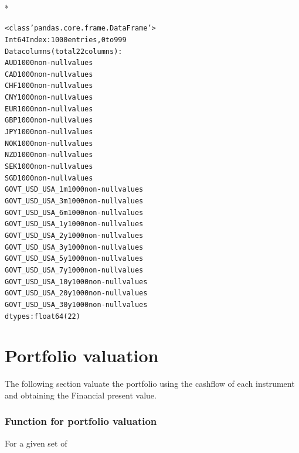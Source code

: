 \documentclass[letterpaper,10pt,english]{/anaconda/lib/python2.7/site-packages/sphinx/texinputs/sphinxhowto}
\def\smaller{\fontsize{9.5pt}{9.5pt}\selectfont}
\newenvironment{InvisibleVerbatim}
        {\begin{mdframed}[leftmargin=0.1\linewidth,innerleftmargin=3pt,innerrightmargin=3pt, userdefinedwidth=1\linewidth, linewidth=0pt, linecolor=white, usetwoside=false]}
        {\end{mdframed}}
\begin{document}
                \makebox[0.1\linewidth]{\smaller\hfill\tt\color{nbframe-out-prompt}Out\hspace{4pt}{[}22{]}:\hspace{4pt}}\\*
                \vspace{-2.55\baselineskip}\begin{InvisibleVerbatim}
                \vspace{-0.5\baselineskip}
\begin{alltt}<class 'pandas.core.frame.DataFrame'>
Int64Index: 1000 entries, 0 to 999
Data columns (total 22 columns):
AUD                 1000  non-null values
CAD                 1000  non-null values
CHF                 1000  non-null values
CNY                 1000  non-null values
EUR                 1000  non-null values
GBP                 1000  non-null values
JPY                 1000  non-null values
NOK                 1000  non-null values
NZD                 1000  non-null values
SEK                 1000  non-null values
SGD                 1000  non-null values
GOVT\_USD\_USA\_1m     1000  non-null values
GOVT\_USD\_USA\_3m     1000  non-null values
GOVT\_USD\_USA\_6m     1000  non-null values
GOVT\_USD\_USA\_1y     1000  non-null values
GOVT\_USD\_USA\_2y     1000  non-null values
GOVT\_USD\_USA\_3y     1000  non-null values
GOVT\_USD\_USA\_5y     1000  non-null values
GOVT\_USD\_USA\_7y     1000  non-null values
GOVT\_USD\_USA\_10y    1000  non-null values
GOVT\_USD\_USA\_20y    1000  non-null values
GOVT\_USD\_USA\_30y    1000  non-null values
dtypes: float64(22)\end{alltt}

            \end{InvisibleVerbatim}
            
        
    
\part{Portfolio valuation}The following section valuate the portfolio using the cashflow of each
instrument and obtaining the Financial present value.\section{Function for portfolio valuation}For a given set of

\end{document}
